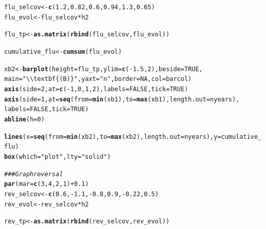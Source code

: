 \documentclass{article}\usepackage[]{graphicx}\usepackage[]{color}
\makeatletter
\newcommand{\hlnum}[1]{\textcolor[rgb]{0.686,0.059,0.569}{#1}}%
\newcommand{\hlstr}[1]{\textcolor[rgb]{0.192,0.494,0.8}{#1}}%
\newcommand{\hlcom}[1]{\textcolor[rgb]{0.678,0.584,0.686}{\textit{#1}}}%
\newcommand{\hlopt}[1]{\textcolor[rgb]{0,0,0}{#1}}%
\newcommand{\hlstd}[1]{\textcolor[rgb]{0.345,0.345,0.345}{#1}}%
\newcommand{\hlkwb}[1]{\textcolor[rgb]{0.69,0.353,0.396}{#1}}%
\newcommand{\hlkwc}[1]{\textcolor[rgb]{0.333,0.667,0.333}{#1}}%
\newcommand{\hlkwd}[1]{\textcolor[rgb]{0.737,0.353,0.396}{\textbf{#1}}}%
\newenvironment{kframe}{%
 \def\at@end@of@kframe{}%
 \ifinner\ifhmode%
  \def\at@end@of@kframe{\end{minipage}}%
  \begin{minipage}{\columnwidth}%
 \fi\fi%
 \def\FrameCommand##1{\hskip\@totalleftmargin \hskip-\fboxsep
 \colorbox{shadecolor}{##1}\hskip-\fboxsep
     \hskip-\linewidth \hskip-\@totalleftmargin \hskip\columnwidth}%
 \MakeFramed {\advance\hsize-\width
   \@totalleftmargin\z@ \linewidth\hsize
   \@setminipage}}%
 {\par\unskip\endMakeFramed%
 \at@end@of@kframe}
\newenvironment{knitrout}{}{} %
\makeatother
\begin{document}
\begin{knitrout}
\begin{kframe}
\begin{alltt}
\hlstd{flu_selcov} \hlkwb{<-} \hlkwd{c}\hlstd{(}\hlnum{1.2}\hlstd{,}\hlnum{0.82}\hlstd{,}\hlnum{0.6}\hlstd{,}\hlnum{0.94}\hlstd{,}\hlnum{1.3}\hlstd{,}\hlnum{0.65}\hlstd{)}
\hlstd{flu_evol} \hlkwb{<-} \hlstd{flu_selcov} \hlopt{*} \hlstd{h2}

\hlstd{flu_tp} \hlkwb{<-} \hlkwd{as.matrix}\hlstd{(}\hlkwd{rbind}\hlstd{(flu_selcov, flu_evol))}

\hlstd{cumulative_flu} \hlkwb{<-} \hlkwd{cumsum}\hlstd{(flu_evol)}

\hlstd{xb2} \hlkwb{<-} \hlkwd{barplot}\hlstd{(}\hlkwc{height} \hlstd{= flu_tp,} \hlkwc{ylim} \hlstd{=} \hlkwd{c}\hlstd{(}\hlopt{-}\hlnum{1.5}\hlstd{,}\hlnum{2}\hlstd{),} \hlkwc{beside} \hlstd{=} \hlnum{TRUE}\hlstd{,}
               \hlkwc{main}\hlstd{=}\hlstr{"\textbackslash{}\textbackslash{}textbf\{(B)\}"}\hlstd{,} \hlkwc{yaxt}\hlstd{=}\hlstr{"n"}\hlstd{,} \hlkwc{border} \hlstd{=} \hlnum{NA}\hlstd{,} \hlkwc{col} \hlstd{= barcol )}
\hlkwd{axis}\hlstd{(}\hlkwc{side}\hlstd{=}\hlnum{2}\hlstd{,} \hlkwc{at} \hlstd{=} \hlkwd{c}\hlstd{(}\hlopt{-}\hlnum{1}\hlstd{,}\hlnum{0}\hlstd{,}\hlnum{1}\hlstd{,}\hlnum{2}\hlstd{),} \hlkwc{labels} \hlstd{=} \hlnum{FALSE}\hlstd{,} \hlkwc{tick} \hlstd{=} \hlnum{TRUE}\hlstd{)}
\hlkwd{axis}\hlstd{(}\hlkwc{side}\hlstd{=}\hlnum{1}\hlstd{,} \hlkwc{at} \hlstd{=} \hlkwd{seq}\hlstd{(}\hlkwc{from}\hlstd{=}\hlkwd{min}\hlstd{(xb1),} \hlkwc{to}\hlstd{=}\hlkwd{max}\hlstd{(xb1),} \hlkwc{length.out} \hlstd{= nyears),}
     \hlkwc{labels} \hlstd{=} \hlnum{FALSE}\hlstd{,}\hlkwc{tick} \hlstd{=} \hlnum{TRUE}\hlstd{)}
\hlkwd{abline}\hlstd{(}\hlkwc{h}\hlstd{=}\hlnum{0}\hlstd{)}

\hlkwd{lines}\hlstd{(}\hlkwc{x}\hlstd{=}\hlkwd{seq}\hlstd{(}\hlkwc{from}\hlstd{=}\hlkwd{min}\hlstd{(xb2),} \hlkwc{to}\hlstd{=}\hlkwd{max}\hlstd{(xb2),} \hlkwc{length.out} \hlstd{= nyears),} \hlkwc{y}\hlstd{=cumulative_flu)}
\hlkwd{box}\hlstd{(}\hlkwc{which} \hlstd{=} \hlstr{"plot"}\hlstd{,} \hlkwc{lty} \hlstd{=} \hlstr{"solid"}\hlstd{)}

\hlcom{### Graph reversal}
\hlkwd{par}\hlstd{(}\hlkwc{mar}\hlstd{=}\hlkwd{c}\hlstd{(}\hlnum{3}\hlstd{,} \hlnum{4}\hlstd{,} \hlnum{2}\hlstd{,}\hlnum{1}\hlstd{)} \hlopt{+} \hlnum{0.1}\hlstd{)}
\hlstd{rev_selcov} \hlkwb{<-} \hlkwd{c}\hlstd{(}\hlnum{0.6}\hlstd{,}\hlopt{-}\hlnum{1.1}\hlstd{,}\hlopt{-}\hlnum{0.8}\hlstd{,}\hlnum{0.9}\hlstd{,}\hlopt{-}\hlnum{0.22}\hlstd{,}\hlnum{0.5}\hlstd{)}
\hlstd{rev_evol} \hlkwb{<-} \hlstd{rev_selcov} \hlopt{*} \hlstd{h2}

\hlstd{rev_tp} \hlkwb{<-} \hlkwd{as.matrix}\hlstd{(}\hlkwd{rbind}\hlstd{(rev_selcov, rev_evol))}


\end{alltt}
\end{kframe}
\end{knitrout}
\end{document}
